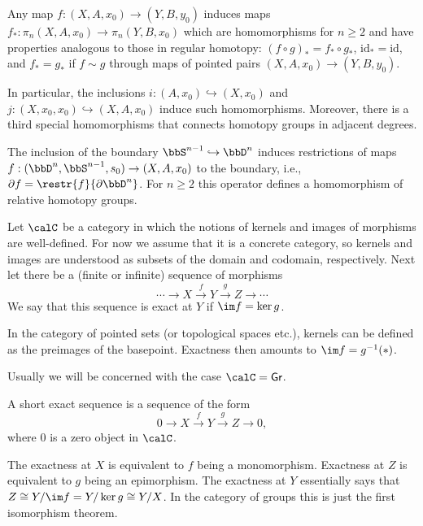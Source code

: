 Any map $f:(X,A,x_0)\to (Y,B,y_0)$ induces maps $f_\ast :\pi_n(X,A,x_0)\to \pi_n(Y,B,x_0)$ which are homomorphisms for $n\geq 2$ and have properties analogous to those in regular homotopy: $(f\circ g)_\ast=f_\ast\circ g_\ast$, $\mathrm{id}_\ast=\mathrm{id}$, and $f_\ast=g_\ast$ if $f\sim g$ through maps of pointed pairs $(X,A,x_0)\to(Y,B,y_0)$.

In particular, the inclusions $i:(A,x_0)\hookrightarrow(X,x_0)$ and $j:(X,x_0,x_0)\hookrightarrow (X,A,x_0)$ induce such homomorphisms. Moreover, there is a third special homomorphisms that connects homotopy groups in adjacent degrees.

\begin{defn}
    The inclusion of the boundary $\bbS^{n-1}\hookrightarrow \bbD^n$ induces restrictions of maps $f:(\bbD^n,\bbS^{n-1},s_0)\to (X,A,x_0)$ to the boundary, i.e., $\partial f=\restr{f}{\partial \bbD^n}$. For $n\geq 2$ this operator defines a homomorphism of relative homotopy groups.
\end{defn}

\begin{defn}
    Let $\calC$ be a category in which the notions of kernels and images of morphisms are well-defined. For now we assume that it is a concrete category, so kernels and images are understood as subsets of the domain and codomain, respectively. Next let there be a (finite or infinite) sequence of morphisms
    \[\cdots\to X\overset{f}{\to } Y\overset{g}{\to} Z\to \cdots \]
    We say that this sequence is exact at $Y$ if $\im f=\ker g$.
\end{defn}
\begin{example}
    In the category of pointed sets (or topological spaces etc.), kernels can be defined as the preimages of the basepoint. Exactness then amounts to $\im f=g^{-1}(*)$.

    Usually we will be concerned with the case $\calC=\mathsf{Gr}$.
\end{example}
\begin{defn}
    A short exact sequence is a sequence of the form
    \[0\to X\overset{f}{\to } Y\overset{g}{\to} Z\to 0,\]
    where $0$ is a zero object in $\calC$.

    The exactness at $X$ is equivalent to $f$ being a monomorphism. Exactness at $Z$ is equivalent to $g$ being an epimorphism. The exactness at $Y$ essentially says that $Z\cong Y\slash \im f=Y\slash \ker g\cong Y\slash X$. In the category of groups this is just the first isomorphism theorem.
\end{defn}

